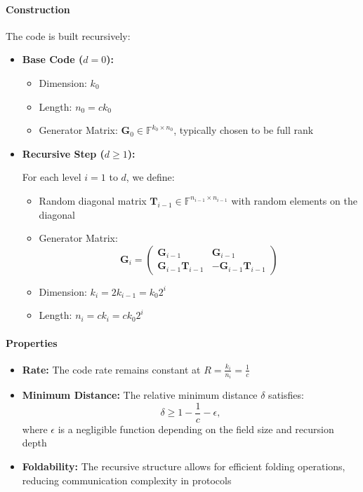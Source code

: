 \documentclass{article}
\theoremstyle{plain}
\theoremstyle{definition}
\theoremstyle{remark}
\theoremstyle{problem}
\begin{document}
\paragraph{Construction}

The code is built recursively:

\begin{itemize}
    \item \textbf{Base Code ($d = 0$):}
    \begin{itemize}
        \item Dimension: $k_0$
        \item Length: $n_0 = c k_0$
        \item Generator Matrix: $\mathbf{G}_0 \in \mathbb{F}^{k_0 \times n_0}$, typically chosen to be full rank
    \end{itemize}

    \item \textbf{Recursive Step ($d \geq 1$):}

    For each level $i = 1$ to $d$, we define:
    \begin{itemize}
        \item Random diagonal matrix $\mathbf{T}_{i-1} \in \mathbb{F}^{n_{i-1} \times n_{i-1}}$ with random elements on the diagonal
        \item Generator Matrix:
        \[
        \mathbf{G}_i = \begin{pmatrix}
        \mathbf{G}_{i-1} & \mathbf{G}_{i-1} \\
        \mathbf{G}_{i-1} \mathbf{T}_{i-1} & -\mathbf{G}_{i-1} \mathbf{T}_{i-1}
        \end{pmatrix}
        \]
        \item Dimension: $k_i = 2 k_{i-1} = k_0 2^i$
        \item Length: $n_i = c k_i = c k_0 2^i$
    \end{itemize}
\end{itemize}

\paragraph{Properties}
\begin{itemize}
    \item \textbf{Rate:} The code rate remains constant at $R = \frac{k_i}{n_i} = \frac{1}{c}$
    \item \textbf{Minimum Distance:} The relative minimum distance $\delta$ satisfies:
    \[
    \delta \geq 1 - \frac{1}{c} - \epsilon,
    \]
    where $\epsilon$ is a negligible function depending on the field size and recursion depth
    \item \textbf{Foldability:} The recursive structure allows for efficient folding operations, reducing communication complexity in protocols
\end{itemize}
\end{document}

